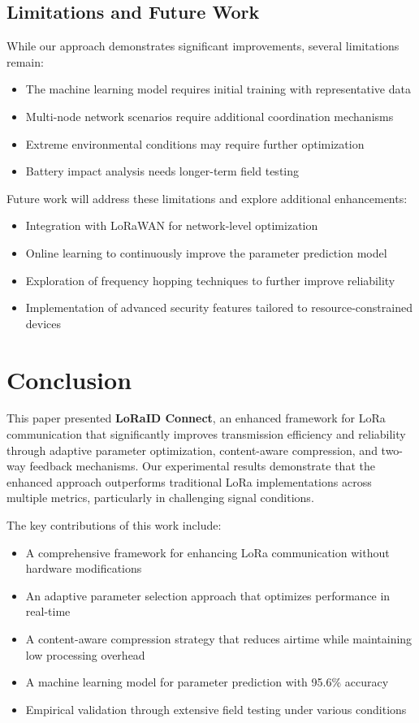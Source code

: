 \documentclass[conference]{IEEEtran}
\begin{document}
\subsection{Limitations and Future Work}
While our approach demonstrates significant improvements, several limitations remain:
\begin{itemize}
    \item The machine learning model requires initial training with representative data
    \item Multi-node network scenarios require additional coordination mechanisms
    \item Extreme environmental conditions may require further optimization
    \item Battery impact analysis needs longer-term field testing
\end{itemize}

Future work will address these limitations and explore additional enhancements:
\begin{itemize}
    \item Integration with LoRaWAN for network-level optimization
    \item Online learning to continuously improve the parameter prediction model
    \item Exploration of frequency hopping techniques to further improve reliability
    \item Implementation of advanced security features tailored to resource-constrained devices
\end{itemize}

\section{Conclusion}
This paper presented \textbf{LoRaID Connect}, an enhanced framework for LoRa communication that significantly improves transmission efficiency and reliability through adaptive parameter optimization, content-aware compression, and two-way feedback mechanisms. Our experimental results demonstrate that the enhanced approach outperforms traditional LoRa implementations across multiple metrics, particularly in challenging signal conditions.

The key contributions of this work include:
\begin{itemize}
    \item A comprehensive framework for enhancing LoRa communication without hardware modifications
    \item An adaptive parameter selection approach that optimizes performance in real-time
    \item A content-aware compression strategy that reduces airtime while maintaining low processing overhead
    \item A machine learning model for parameter prediction with 95.6\% accuracy
    \item Empirical validation through extensive field testing under various conditions
\end{itemize}
\end{document}
